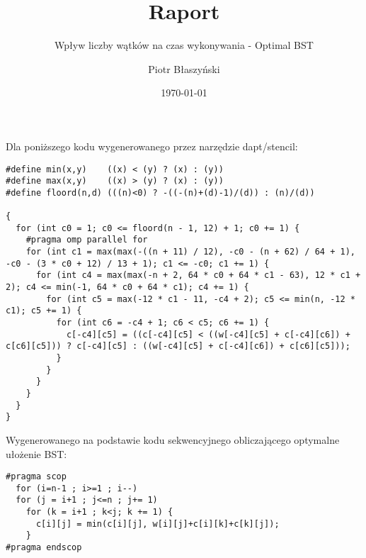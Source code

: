 \documentclass[a4paper,12pt]{scrartcl}
\title{Raport}
\subtitle{Wpływ liczby wątków na czas wykonywania - Optimal BST}
\author{Piotr Błaszyński}
\date{\today}
\begin{document}
\maketitle
{}

Dla poniższego kodu wygenerowanego przez narzędzie dapt/stencil:
\begin{lstlisting}
#define min(x,y)    ((x) < (y) ? (x) : (y))
#define max(x,y)    ((x) > (y) ? (x) : (y))
#define floord(n,d) (((n)<0) ? -((-(n)+(d)-1)/(d)) : (n)/(d))

{
  for (int c0 = 1; c0 <= floord(n - 1, 12) + 1; c0 += 1) {
    #pragma omp parallel for
    for (int c1 = max(max(-((n + 11) / 12), -c0 - (n + 62) / 64 + 1), -c0 - (3 * c0 + 12) / 13 + 1); c1 <= -c0; c1 += 1) {
      for (int c4 = max(max(-n + 2, 64 * c0 + 64 * c1 - 63), 12 * c1 + 2); c4 <= min(-1, 64 * c0 + 64 * c1); c4 += 1) {
        for (int c5 = max(-12 * c1 - 11, -c4 + 2); c5 <= min(n, -12 * c1); c5 += 1) {
          for (int c6 = -c4 + 1; c6 < c5; c6 += 1) {
            c[-c4][c5] = ((c[-c4][c5] < ((w[-c4][c5] + c[-c4][c6]) + c[c6][c5])) ? c[-c4][c5] : ((w[-c4][c5] + c[-c4][c6]) + c[c6][c5]));
          }
        }
      }
    }
  }
}
\end{lstlisting}

Wygenerowanego na podstawie kodu sekwencyjnego obliczającego optymalne ułożenie BST:
\begin{lstlisting}
#pragma scop
  for (i=n-1 ; i>=1 ; i--)
  for (j = i+1 ; j<=n ; j+= 1)
    for (k = i+1 ; k<j; k += 1) {
      c[i][j] = min(c[i][j], w[i][j]+c[i][k]+c[k][j]);
    }
#pragma endscop
\end{lstlisting}
\end{document}
